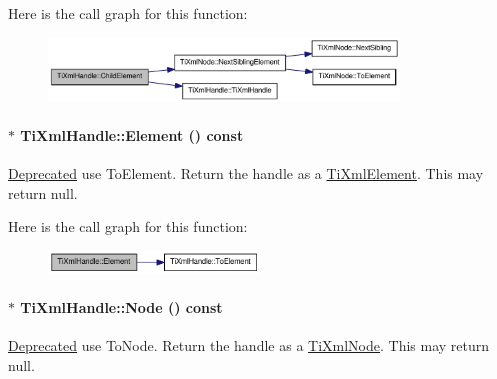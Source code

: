 Here is the call graph for this function:\nopagebreak
\begin{figure}[H]
\begin{center}
\leavevmode
\includegraphics[width=264pt]{class_ti_xml_handle_a979a3f850984a176ee884e394c7eed2d_cgraph}
\end{center}
\end{figure}
\hypertarget{class_ti_xml_handle_acb5fe8388a526289ea65e817a51e05e7}{
\paragraph[{Element}]{$\ast$ TiXmlHandle::Element () const}\hfill}
\label{class_ti_xml_handle_acb5fe8388a526289ea65e817a51e05e7}
\begin{Desc}
\item[\hyperlink{deprecated__deprecated000002}{Deprecated}]use ToElement. Return the handle as a \hyperlink{class_ti_xml_element}{TiXmlElement}. This may return null. \end{Desc}


Here is the call graph for this function:\nopagebreak
\begin{figure}[H]
\begin{center}
\leavevmode
\includegraphics[width=159pt]{class_ti_xml_handle_acb5fe8388a526289ea65e817a51e05e7_cgraph}
\end{center}
\end{figure}
\hypertarget{class_ti_xml_handle_ab44b723a8dc9af72838a303c079d0376}{
\paragraph[{Node}]{$\ast$ TiXmlHandle::Node () const}\hfill}
\label{class_ti_xml_handle_ab44b723a8dc9af72838a303c079d0376}
\begin{Desc}
\item[\hyperlink{deprecated__deprecated000001}{Deprecated}]use ToNode. Return the handle as a \hyperlink{class_ti_xml_node}{TiXmlNode}. This may return null. \end{Desc}


